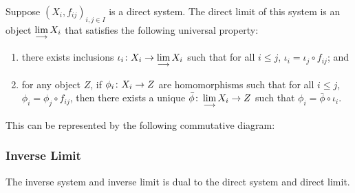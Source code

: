 \begin{definition}
    Suppose \({(X_i,f_{ij})}_{i,j \in I}\) is a direct system.
    The direct limit of this system is an object \(\operatorname{\displaystyle\lim_{\longrightarrow}} X_i\)
    that satisfies the following universal property:
    \begin{enumerate}[label={(\roman*)}, itemsep=0mm]
        \item there exists inclusions \(\iota_i\colon X_i\to\operatorname{\displaystyle\lim_{\longrightarrow}} X_i\)
            such that for all \(i \leq j\), \(\iota_i = \iota_j \circ f_{ij}\); and
        \item for any object \(Z\), if \(\phi_i\colon X_i\to Z\) are homomorphisms
            such that for all \(i \leq j\), \(\phi_i = \phi_j \circ f_{ij}\),
            then there exists a unique \(\bar{\phi}\colon\operatorname{\displaystyle\lim_{\longrightarrow}} X_i\to Z\)
            such that \(\phi_i = \bar{\phi}\circ\iota_i\).
    \end{enumerate}

    This can be represented by the following commutative diagram:
    \begin{center}
    \end{center}
\end{definition}

\subsubsection*{Inverse Limit}

\begin{remark}
    The inverse system and inverse limit
    is dual to the direct system and direct limit.
\end{remark}

